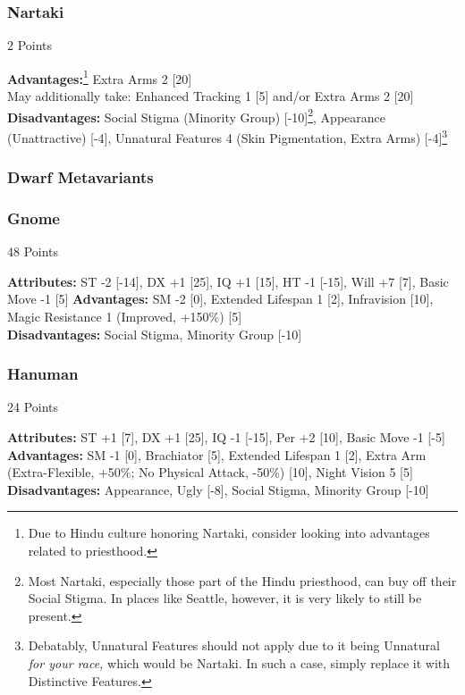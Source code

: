 \begin{multicols*}{3}
	\subsubsection*{Nartaki}
	\begin{flushright}
		2 Points
	\end{flushright}
	\textbf{Advantages:}\footnote{Due to Hindu culture honoring Nartaki, consider looking into advantages related to priesthood.} 
	Extra Arms 2 [20]
	\\May additionally take: Enhanced Tracking 1 [5] and/or Extra Arms 2 [20]
	\\\textbf{Disadvantages:} 
	Social Stigma (Minority Group) [-10]\footnote{Most Nartaki, especially those part of the Hindu priesthood, can buy off their Social Stigma. In places like Seattle, however, it is very likely to still be present.}, Appearance (Unattractive) [-4], Unnatural Features 4 (Skin Pigmentation, Extra Arms) [-4]\footnote{Debatably, Unnatural Features should not apply due to it being Unnatural \textit{for your race,} which would be Nartaki. In such a case, simply replace it with Distinctive Features.}
	
	\subsubsection{Dwarf Metavariants}
	
	\subsubsection*{Gnome}
	\begin{flushright}
		48 Points
	\end{flushright}
	\textbf{Attributes:}
	ST -2 [-14], DX +1 [25], IQ +1 [15], HT -1 [-15], Will +7 [7], Basic Move -1 [5]
	\textbf{Advantages:}
	SM -2 [0], Extended Lifespan 1 [2], Infravision [10], Magic Resistance 1 (Improved, +150\%) [5]
	\\\textbf{Disadvantages:} 
	Social Stigma, Minority Group [-10]
	
	\subsubsection*{Hanuman}
	\begin{flushright}
		24 Points
	\end{flushright}
	\textbf{Attributes:}
	ST +1 [7], DX +1 [25], IQ -1 [-15], Per +2 [10], Basic Move -1 [-5]
	\textbf{Advantages:}
	SM -1 [0], Brachiator [5], Extended Lifespan 1 [2], Extra Arm (Extra-Flexible, +50\%; No Physical Attack, -50\%) [10], Night Vision 5 [5]
	\\\textbf{Disadvantages:} 
	Appearance, Ugly [-8], Social Stigma, Minority Group [-10]
	

\end{multicols*}

